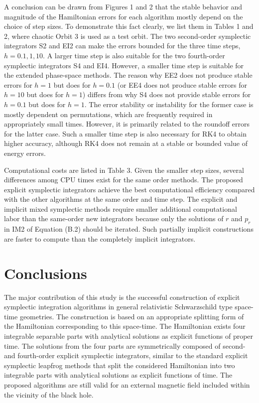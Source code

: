 \documentclass[preprint2]{aastex}
\begin{document}
A conclusion can be drawn from  Figures 1 and 2 that the stable
behavior and magnitude of the Hamiltonian errors for each
algorithm mostly depend on the choice of step sizes. To
demonstrate this fact clearly, we list them in Tables 1 and 2,
where chaotic Orbit 3 is used as a test orbit. The two
second-order symplectic integrators S2 and EI2 can make the errors
bounded for the three time steps, $h=0.1, 1, 10$. A larger time
step is also suitable for the two fourth-order symplectic
integrators S4 and EI4. However, a smaller time step is suitable
for the extended phase-space methods. The reason why EE2 does not
produce stable errors for $h=1$ but does for $h=0.1$ (or EE4 does
not produce stable errors for $h=10$ but does for $h=1$) differs
from why S4 does not provide stable errors for $h=0.1$ but does
for $h=1$. The error stability or instability for the former case
is mostly dependent on permutations, which are frequently required
in appropriately small times. However, it is primarily related to
the roundoff errors for the latter case. Such a smaller time step
is also necessary for RK4 to obtain higher accuracy, although RK4
does not remain at a stable or bounded value of energy errors.

Computational costs are listed in Table 3. Given the smaller step
sizes, several differences among CPU times exist for the same
order methods. The proposed explicit symplectic integrators
achieve the best computational efficiency compared with the other
algorithms at the same order and time step. The explicit and
implicit mixed symplectic methods require smaller additional
computational labor than the same-order new integrators because
only the solutions of $r$ and $p_r$ in IM2 of Equation (B.2)
should be iterated. Such partially implicit constructions are
faster to compute than the completely implicit integrators.

\section{Conclusions}

The major contribution of this study is the successful
construction of explicit symplectic integration algorithms in
general relativistic Schwarzschild type space-time geometries. The
construction is based on an appropriate splitting form of the
Hamiltonian corresponding to this space-time. The Hamiltonian
exists four integrable separable parts with analytical solutions
as explicit functions of proper time. The solutions from the four
parts are symmetrically composed of second- and fourth-order
explicit symplectic integrators, similar to the standard explicit
symplectic leapfrog methods that split the considered Hamiltonian
into two integrable parts with analytical solutions as explicit
functions of time. The proposed algorithms are still valid for an
external magnetic field included within the vicinity of the black
hole.
\end{document}
